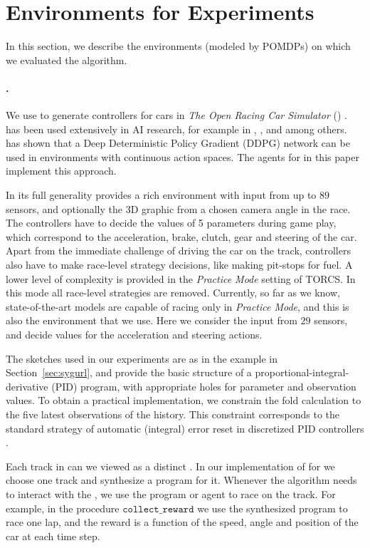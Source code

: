 \section{Environments for Experiments}
\label{sec:environments}
In this section, we describe the environments (modeled by POMDPs) on which we evaluated the \algo algorithm. 

\paragraph{\torcs.} We use \algo to generate controllers for cars in \emph{The Open Racing Car Simulator} (\torcs) \cite{TORCS}. \torcs has been used extensively in AI research, for example in \cite{TORCS:FuzzyControl}, \cite{TORCS:NN}, and \cite{TORCS:Overtake} among others. \cite{NN:DDPG} has shown that a Deep Deterministic Policy Gradient (DDPG) network can be used in \rl environments with continuous action spaces. The \drl agents for \torcs in this paper implement this approach.

In its full generality \torcs provides a rich environment with input from up to $89$ sensors, and optionally the 3D graphic from a chosen camera angle in the race. The controllers have to decide the values of 5 parameters during game play, which correspond to the acceleration, brake, clutch, gear and steering of the car. 
Apart from the immediate challenge of driving the car on the track, controllers also have to make race-level strategy decisions, like making pit-stops for fuel. A lower level of complexity is provided in the \emph{Practice Mode} setting of TORCS. In this mode all race-level strategies are removed. Currently, so far as we know, state-of-the-art \drl models are capable of racing only in \emph{Practice Mode}, and this is also the environment that we use. Here we consider the input from $29$ sensors, and decide values for the acceleration and steering actions.

The sketches used in our experiments are as in the example in Section~\ref{sec:sygurl}, and provide the basic structure of a proportional-integral-derivative (PID) program, with appropriate holes for parameter and observation values. To obtain a practical implementation, we constrain the fold calculation to the five latest observations of the history. This constraint corresponds to the standard strategy of automatic (integral) error reset in discretized PID controllers \cite{PIDControl}.

Each track in \torcs can we viewed as a distinct \pomdp. In our implementation of \algo for \torcs we choose one track and synthesize a program for it. Whenever the algorithm needs to interact with the \pomdp, we use the program or \drl agent to race on the track. For example, in the procedure $\mathtt{collect\_reward}$ we use the synthesized program to race one lap, and the reward is a function of the speed, angle and position of the car at each time step.

